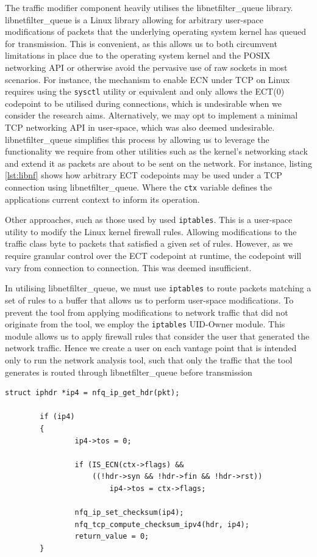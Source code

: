 \documentclass{l4proj}
\begin{document}
The traffic modifier component heavily utilises the libnetfilter\_queue library. libnetfilter\_queue is a Linux library allowing for arbitrary user-space modifications of packets that the underlying operating system kernel has queued for transmission. This is convenient, as this allows us to both circumvent limitations in place due to the operating system kernel and the POSIX networking API or otherwise avoid the pervasive use of raw sockets in most scenarios. For instance, the mechanism to enable ECN under TCP on Linux requires using the \lstinline{sysctl} utility or equivalent and only allows the ECT(0) codepoint to be utilised during connections, which is undesirable when we consider the research aims. Alternatively, we may opt to implement a minimal TCP networking API in user-space, which was also deemed undesirable. libnetfilter\_queue simplifies this process by allowing us to leverage the functionality we require from other utilities such as the kernel's networking stack and extend it as packets are about to be sent on the network. For instance, listing \ref{lst:libnf} shows how arbitrary ECT codepoints may be used under a TCP connection using libnetfilter\_queue. Where the \lstinline{ctx} variable defines the applications current context to inform its operation.

Other approaches, such as those used by \cite{bauer_measuring_2011} used \lstinline{iptables}. This is a user-space utility to modify the Linux kernel firewall rules. Allowing modifications to the traffic class byte to packets that satisfied a given set of rules. However, as we require granular control over the ECT codepoint at runtime, the codepoint will vary from connection to connection. This was deemed insufficient.

In utilising libnetfilter\_queue, we must use \lstinline{iptables} to route packets matching a set of rules to a buffer that allows us to perform user-space modifications. To prevent the tool from applying modifications to network traffic that did not originate from the tool, we employ the \lstinline{iptables} UID-Owner module. This module allows us to apply firewall rules that consider the user that generated the network traffic. Hence we create a user on each vantage point that is intended only to run the network analysis tool, such that only the traffic that the tool generates is routed through libnetfilter\_queue before transmission

\begin{lstlisting}[caption={A demonstration of userspace modification of the traffic class byte on packets queued by the operating system kernel for transmission on the network.}]
struct iphdr *ip4 = nfq_ip_get_hdr(pkt);

        if (ip4)
        {
                ip4->tos = 0;

                if (IS_ECN(ctx->flags) && 
                    ((!hdr->syn && !hdr->fin && !hdr->rst))
                        ip4->tos = ctx->flags;

                nfq_ip_set_checksum(ip4);
                nfq_tcp_compute_checksum_ipv4(hdr, ip4);
                return_value = 0;
        }
\end{lstlisting}
\label{lst:libnf}
\end{document}
